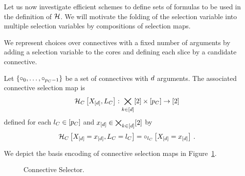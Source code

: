 
Let us now investigate efficient schemes to define sets of formulas to be used in the definition of $\mathcal{H}$.
We will motivate the folding of the selection variable into multiple selection variables by compositions of selection maps.



We represent choices over connectives with a fixed number of arguments by adding a selection variable to the cores and defining each slice by a candidate connective.

\begin{definition}\label{def:connectiveSelector}
	Let $\{\circ_{0},\ldots,\circ_{p_{C}-1}\}$ be a set of connectives with $d$ arguments.
	The associated connective selection map is
		\[ \mathcal{H}_{C}\left[X_{[d]},L_{C}\right]
		: \bigtimes_{k\in[d]}[2] \times [p_{C}] \rightarrow [2] \]
	defined for each $l_{C}\in[p_{C}]$ and $x_{[d]}\in\bigtimes_{k\in[d]}[2]$ by 
		\[ \mathcal{H}_{C}\left[X_{[d]}=x_{[d]},L_{C}=l_{C}\right] 
		= \circ_{l_{C}}\left[X_{[d]}=x_{[d]}\right]  \, . \]
\end{definition}

We depict the basis encoding of connective selection maps in Figure~\ref{fig:connectiveSelector}.

\begin{figure}[h]
\begin{center}
	
\end{center}
\caption{Connective Selector.}
\label{fig:connectiveSelector}
\end{figure}






